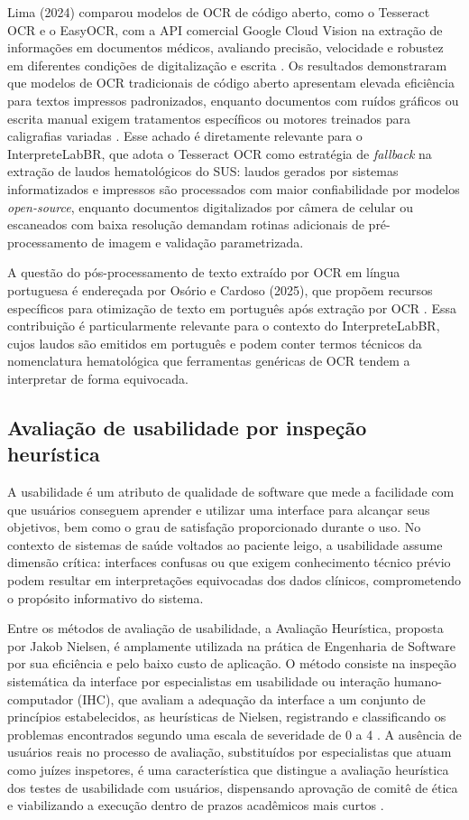 \documentclass[12pt]{article}
\begin{document}
Lima (2024) comparou modelos de OCR de código aberto, como o Tesseract OCR e o EasyOCR, com a API comercial Google Cloud Vision na extração de informações em documentos médicos, avaliando precisão, velocidade e robustez em diferentes condições de digitalização e escrita \cite{lima2024}. Os resultados demonstraram que modelos de OCR tradicionais de código aberto apresentam elevada eficiência para textos impressos padronizados, enquanto documentos com ruídos gráficos ou escrita manual exigem tratamentos específicos ou motores treinados para caligrafias variadas \cite{lima2024}. Esse achado é diretamente relevante para o InterpreteLabBR, que adota o Tesseract OCR como estratégia de \emph{fallback} na extração de laudos hematológicos do SUS: laudos gerados por sistemas informatizados e impressos são processados com maior confiabilidade por modelos \emph{open-source}, enquanto documentos digitalizados por câmera de celular ou escaneados com baixa resolução demandam rotinas adicionais de pré-processamento de imagem e validação parametrizada.

A questão do pós-processamento de texto extraído por OCR em língua portuguesa é endereçada por Osório e Cardoso (2025), que propõem recursos específicos para otimização de texto em português após extração por OCR \cite{osorio2025}. Essa contribuição é particularmente relevante para o contexto do InterpreteLabBR, cujos laudos são emitidos em português e podem conter termos técnicos da nomenclatura hematológica que ferramentas genéricas de OCR tendem a interpretar de forma equivocada.

\subsection{Avaliação de usabilidade por inspeção heurística}

A usabilidade é um atributo de qualidade de software que mede a facilidade com que usuários conseguem aprender e utilizar uma interface para alcançar seus objetivos, bem como o grau de satisfação proporcionado durante o uso. No contexto de sistemas de saúde voltados ao paciente leigo, a usabilidade assume dimensão crítica: interfaces confusas ou que exigem conhecimento técnico prévio podem resultar em interpretações equivocadas dos dados clínicos, comprometendo o propósito informativo do sistema.

Entre os métodos de avaliação de usabilidade, a Avaliação Heurística, proposta por Jakob Nielsen, é amplamente utilizada na prática de Engenharia de Software por sua eficiência e pelo baixo custo de aplicação. O método consiste na inspeção sistemática da interface por especialistas em usabilidade ou interação humano-computador (IHC), que avaliam a adequação da interface a um conjunto de princípios estabelecidos, as heurísticas de Nielsen, registrando e classificando os problemas encontrados segundo uma escala de severidade de 0 a 4 \cite{cardieri2018}. A ausência de usuários reais no processo de avaliação, substituídos por especialistas que atuam como juízes inspetores, é uma característica que distingue a avaliação heurística dos testes de usabilidade com usuários, dispensando aprovação de comitê de ética e viabilizando a execução dentro de prazos acadêmicos mais curtos \cite{cardieri2018}.
\end{document}
